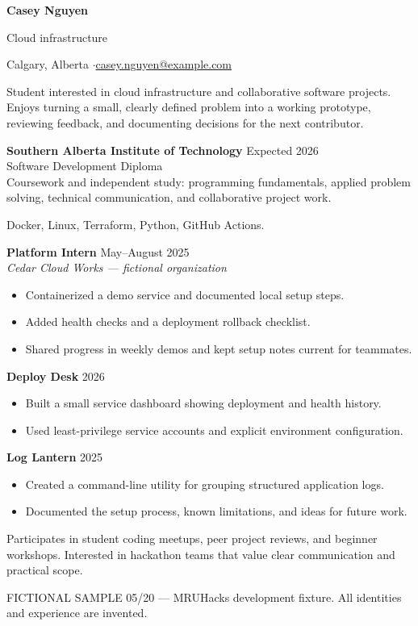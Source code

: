 
{\Huge\bfseries Casey Nguyen}\par
{\large\color{accent} Cloud infrastructure}\par
Calgary, Alberta \enspace$\cdot$\enspace \href{mailto:casey.nguyen@example.com}{casey.nguyen@example.com}

Student interested in cloud infrastructure and collaborative software projects.
Enjoys turning a small, clearly defined problem into a working prototype,
reviewing feedback, and documenting decisions for the next contributor.

\textbf{Southern Alberta Institute of Technology} \hfill Expected 2026\\
Software Development Diploma\\
Coursework and independent study: programming fundamentals, applied problem solving,
technical communication, and collaborative project work.

Docker, Linux, Terraform, Python, GitHub Actions.

\textbf{Platform Intern} \hfill May--August 2025\\
\textit{Cedar Cloud Works --- fictional organization}
\begin{itemize}
\item Containerized a demo service and documented local setup steps.
\item Added health checks and a deployment rollback checklist.
\item Shared progress in weekly demos and kept setup notes current for teammates.
\end{itemize}

\textbf{Deploy Desk} \hfill 2026
\begin{itemize}
\item Built a small service dashboard showing deployment and health history.
\item Used least-privilege service accounts and explicit environment configuration.
\end{itemize}
\textbf{Log Lantern} \hfill 2025
\begin{itemize}
\item Created a command-line utility for grouping structured application logs.
\item Documented the setup process, known limitations, and ideas for future work.
\end{itemize}

Participates in student coding meetups, peer project reviews, and beginner workshops.
Interested in hackathon teams that value clear communication and practical scope.

\vfill
{\footnotesize\color{gray} FICTIONAL SAMPLE 05/20 --- MRUHacks development fixture.
All identities and experience are invented.}

